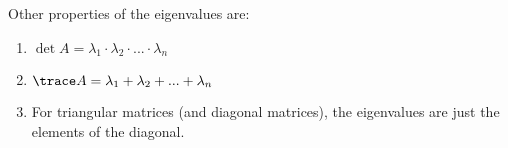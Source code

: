 Other properties of the eigenvalues are:

\begin{enumerate}[label=(\roman*)]
    \item $\det A=\lambda_1\cdot\lambda_2\cdot ...\cdot\lambda_n$
    \item $\trace A=\lambda_1+\lambda_2+ ...+\lambda_n$
    \item For triangular matrices (and diagonal matrices), the eigenvalues are just the elements of the diagonal.
\end{enumerate}